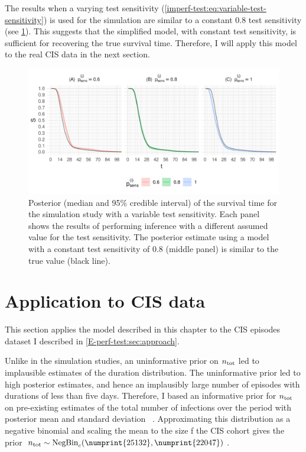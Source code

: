 \documentclass[thesis.tex]{subfiles}
\begin{document}
The results when a varying test sensitivity (\cref{imperf-test:eq:variable-test-sensitivity}) is used for the simulation are similar to a constant 0.8 test sensitivity (see \cref{imperf-test:fig:variable-test-sensitivity}).
This suggests that the simplified model, with constant test sensitivity, is sufficient for recovering the true survival time.
Therefore, I will apply this model to the real CIS data in the next section.
\begin{figure}
    \includegraphics[width=\textwidth]{cis-imperfect-testing/sim-variable-sensitivity}
  \caption[Simulation study results with varying test sensitivity]{%
    Posterior (median and 95\% credible interval) of the survival time for the simulation study with a variable test sensitivity.
    Each panel shows the results of performing inference with a different assumed value for the test sensitivity.
    The posterior estimate using a model with a constant test sensitivity of 0.8 (middle panel) is similar to the true value (black line).
  }
  \label{imperf-test:fig:variable-test-sensitivity}
\end{figure}

\section{Application to CIS data} \label{imperf-test:sec:application}

This section applies the model described in this chapter to the CIS episodes dataset I described in \cref{E-perf-test:sec:approach}.

Unlike in the simulation studies, an uninformative prior on $n_\text{tot}$ led to implausible estimates of the duration distribution.
The uninformative prior led to high posterior estimates, and hence an implausibly large number of episodes with durations of less than five days.
Therefore, I based an informative prior for $n_\text{tot}$ on pre-existing estimates of the total number of infections over the period with posterior mean  and standard deviation ~\autocite{birrellRTM2}.
Approximating this distribution as a negative binomial and scaling the mean to the size f the CIS cohort gives the prior $\ntot \sim \NBc(\numprint{25132}, \numprint{22047})$.
\end{document}
